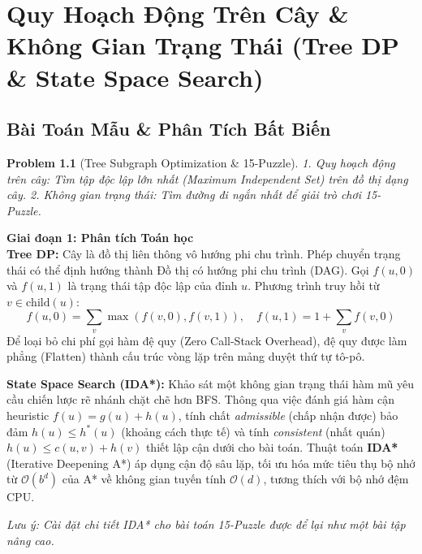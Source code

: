 \documentclass[11pt, letterpaper]{report}
\newtheorem{baitoan}{Problem}[chapter]
\begin{document}
\chapter{Quy Hoạch Động Trên Cây \& Không Gian Trạng Thái (Tree DP \& State Space Search)}
\label{mod:tree_dp}

\section{Bài Toán Mẫu \& Phân Tích Bất Biến}
\begin{baitoan}[Tree Subgraph Optimization \& 15-Puzzle]
1. Quy hoạch động trên cây: Tìm tập độc lập lớn nhất (Maximum Independent Set) trên đồ thị dạng cây.
2. Không gian trạng thái: Tìm đường đi ngắn nhất để giải trò chơi 15-Puzzle.
\end{baitoan}

\noindent\textbf{Giai đoạn 1: Phân tích Toán học}\\
\textbf{Tree DP:} Cây là đồ thị liên thông vô hướng phi chu trình. Phép chuyển trạng thái có thể định hướng thành Đồ thị có hướng phi chu trình (DAG). Gọi $f(u, 0)$ và $f(u, 1)$ là trạng thái tập độc lập của đỉnh $u$. Phương trình truy hồi từ $v \in \text{child}(u)$:
$$ f(u, 0) = \sum_{v} \max(f(v, 0), f(v, 1)), \quad f(u, 1) = 1 + \sum_{v} f(v, 0) $$
Để loại bỏ chi phí gọi hàm đệ quy (Zero Call-Stack Overhead), đệ quy được làm phẳng (Flatten) thành cấu trúc vòng lặp trên mảng duyệt thứ tự tô-pô.

\textbf{State Space Search (IDA*):} Khảo sát một không gian trạng thái hàm mũ yêu cầu chiến lược rẽ nhánh chặt chẽ hơn BFS. Thông qua việc đánh giá hàm cận heuristic $f(u) = g(u) + h(u)$, tính chất \textit{admissible} (chấp nhận được) bảo đảm $h(u) \le h^*(u)$ (khoảng cách thực tế) và tính \textit{consistent} (nhất quán) $h(u) \le c(u, v) + h(v)$ thiết lập cận dưới cho bài toán. Thuật toán \textbf{IDA*} (Iterative Deepening A*) áp dụng cận độ sâu lặp, tối ưu hóa mức tiêu thụ bộ nhớ từ $\mathcal{O}(b^d)$ của A* về không gian tuyến tính $\mathcal{O}(d)$, tương thích với bộ nhớ đệm CPU.

\textit{Lưu ý: Cài đặt chi tiết IDA* cho bài toán 15-Puzzle được để lại như một bài tập nâng cao.}
\end{document}
